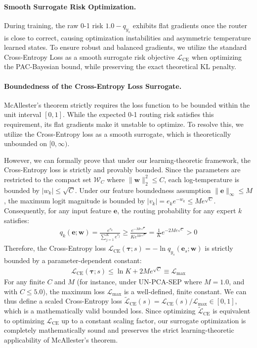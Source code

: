 \paragraph{Smooth Surrogate Risk Optimization.} During training, the raw 0-1 risk $1.0 - q_{y_s}$ exhibits flat gradients once the router is close to correct, causing optimization instabilities and asymmetric temperature learned states. To ensure robust and balanced gradients, we utilize the standard Cross-Entropy Loss as a smooth surrogate risk objective $\mathcal{L}_{\text{CE}}$ when optimizing the PAC-Bayesian bound, while preserving the exact theoretical KL penalty.

\paragraph{Boundedness of the Cross-Entropy Loss Surrogate.}
McAllester's theorem strictly requires the loss function to be bounded within the unit interval $[0, 1]$. While the expected 0-1 routing risk satisfies this requirement, its flat gradients make it unstable to optimize. To resolve this, we utilize the Cross-Entropy loss as a smooth surrogate, which is theoretically unbounded on $[0, \infty)$. 

However, we can formally prove that under our learning-theoretic framework, the Cross-Entropy loss is strictly and provably bounded. Since the parameters are restricted to the compact set $\mathcal{W}_C$ where $\|\mathbf{w}\|_2^2 \le C$, each log-temperature is bounded by $|w_k| \le \sqrt{C}$. Under our feature boundedness assumption $\|\mathbf{e}\|_\infty \le M$, the maximum logit magnitude is bounded by $|v_k| = e_k e^{-w_k} \le M e^{\sqrt{C}}$. Consequently, for any input feature $\mathbf{e}$, the routing probability for any expert $k$ satisfies:
\begin{align}
    q_k(\mathbf{e}; \mathbf{w}) = \frac{e^{v_k}}{\sum_{j=1}^K e^{v_j}} \ge \frac{e^{-M e^{\sqrt{C}}}}{K e^{M e^{\sqrt{C}}}} = \frac{1}{K} e^{-2 M e^{\sqrt{C}}} > 0
\end{align}
Therefore, the Cross-Entropy loss $\mathcal{L}_{\text{CE}}(\boldsymbol{\tau}; s) = -\ln q_{y_s}(\mathbf{e}_s; \mathbf{w})$ is strictly bounded by a parameter-dependent constant:
\begin{align}
    \mathcal{L}_{\text{CE}}(\boldsymbol{\tau}; s) \le \ln K + 2 M e^{\sqrt{C}} \equiv \mathcal{L}_{\max}
\end{align}
For any finite $C$ and $M$ (for instance, under UN-PCA-SEP where $M=1.0$, and with $C \le 5.0$), the maximum loss $\mathcal{L}_{\max}$ is a well-defined, finite constant. We can thus define a scaled Cross-Entropy loss $\tilde{\mathcal{L}}_{\text{CE}}(s) = \mathcal{L}_{\text{CE}}(s) / \mathcal{L}_{\max} \in [0, 1]$, which is a mathematically valid bounded loss. Since optimizing $\tilde{\mathcal{L}}_{\text{CE}}$ is equivalent to optimizing $\mathcal{L}_{\text{CE}}$ up to a constant scaling factor, our surrogate optimization is completely mathematically sound and preserves the strict learning-theoretic applicability of McAllester's theorem.

